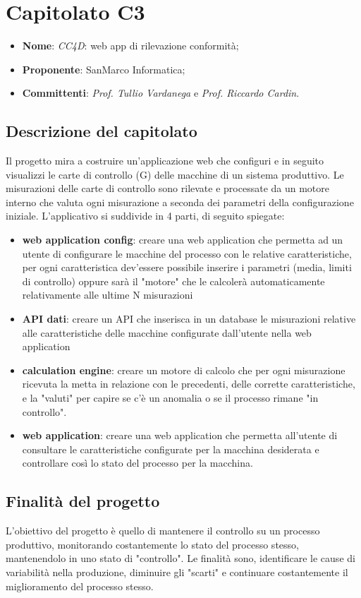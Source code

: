 \section{Capitolato C3}
	\begin{itemize}
		\item \textbf{Nome}: \textit{CC4D}: web app di rilevazione conformità;
		\item \textbf{Proponente}: SanMarco Informatica;
		\item \textbf{Committenti}: \textit{Prof. Tullio Vardanega} e \textit{Prof. Riccardo Cardin}.
	\end{itemize}
	\subsection{Descrizione del capitolato}
	Il progetto mira a costruire un'applicazione web che configuri e in seguito visualizzi le carte di controllo (G) delle macchine di un sistema produttivo. Le misurazioni delle carte di controllo sono rilevate e processate da un motore interno che valuta ogni misurazione a seconda dei parametri della configurazione iniziale.
	L'applicativo si suddivide in 4 parti, di seguito spiegate:
	\begin{itemize}
		\item \textbf{web application config}: creare una web application che permetta ad un utente di configurare le macchine del processo con le relative caratteristiche, per ogni caratteristica dev'essere possibile inserire i parametri (media, limiti di controllo) oppure sarà il "motore" che le calcolerà automaticamente relativamente alle ultime N misurazioni
		\item \textbf{API dati}: creare un API che inserisca in un database le misurazioni relative alle caratteristiche delle macchine configurate dall'utente nella web application
		\item \textbf{calculation engine}: creare un motore di calcolo che per ogni misurazione ricevuta la metta in relazione con le precedenti, delle corrette caratteristiche, e la "valuti" per capire se c'è un anomalia o se il processo rimane "in controllo".
		\item \textbf{web application}: creare una web application che permetta all'utente di consultare le caratteristiche configurate per la macchina desiderata e controllare così lo stato del processo per la macchina.
	\end{itemize}
	\subsection{Finalità del progetto}
	L'obiettivo del progetto è quello di mantenere il controllo su un processo produttivo, monitorando costantemente lo stato del processo stesso, mantenendolo in uno stato di "controllo". Le finalità sono, identificare le cause di variabilità nella produzione, diminuire gli "scarti" e continuare costantemente il miglioramento del processo stesso.
